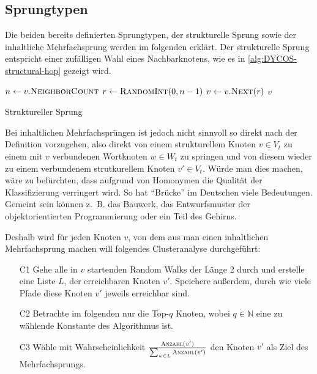 \subsection{Sprungtypen}\label{sec:sprungtypen}
Die beiden bereits definierten Sprungtypen, der strukturelle Sprung
sowie der inhaltliche Mehrfachsprung werden im folgenden erklärt.
\goodbreak
Der strukturelle Sprung entspricht einer zufälligen Wahl eines 
Nachbarknotens, wie es in \cref{alg:DYCOS-structural-hop}
gezeigt wird.
\begin{algorithm}[H]
    \begin{algorithmic}[1]
            \State $n \gets v.\Call{NeighborCount}{}$ 
            \State $r \gets \Call{RandomInt}{0, n-1}$ 
            \State $v \gets v.\Call{Next}{r}$ 
            \State \Return $v$
        \EndProcedure
    \end{algorithmic}
\caption{Struktureller Sprung}
\label{alg:DYCOS-structural-hop}
\end{algorithm}

Bei inhaltlichen Mehrfachsprüngen ist jedoch nicht sinnvoll so direkt
nach der Definition vorzugehen,  also
direkt von einem strukturellem Knoten 
$v \in V_t$ zu einem mit $v$ verbundenen Wortknoten $w \in W_t$ zu springen
und von diesem wieder zu einem verbundenem strutkurellem Knoten 
$v' \in V_t$. Würde man dies machen, wäre zu befürchten, dass
aufgrund von Homonymen die Qualität der Klassifizierung verringert
wird. So hat \enquote{Brücke} im Deutschen viele Bedeutungen.
Gemeint sein können z.~B. das Bauwerk, das Entwurfsmuster der
objektorientierten Programmierung oder ein Teil des Gehirns.

Deshalb wird für jeden Knoten $v$, von dem aus man einen inhaltlichen
Mehrfachsprung machen will folgendes Clusteranalyse durchgeführt:
\begin{enumerate}[label=C\arabic*),ref=C\arabic*]
    \item[C1] Gehe alle in $v$ startenden Random Walks der Länge 2 durch
          und erstelle eine Liste $L$, der erreichbaren Knoten $v'$. Speichere
          außerdem, durch wie viele Pfade diese Knoten $v'$ jeweils erreichbar sind.
    \item[C2] Betrachte im folgenden nur die Top-$q$ Knoten, wobei $q \in \mathbb{N}$
          eine zu wählende Konstante des Algorithmus ist. \label{list:aggregate.2}
    \item[C3] Wähle mit Wahrscheinlichkeit $\frac{\Call{Anzahl}{v'}}{\sum_{w \in L} \Call{Anzahl}{v'}}$
          den Knoten $v'$ als Ziel des Mehrfachsprungs.
\end{enumerate}

